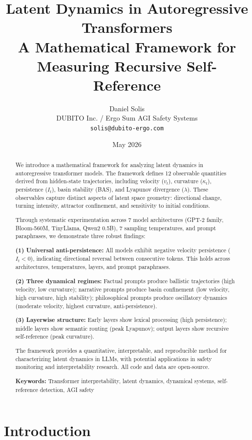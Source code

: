 \documentclass[12pt,a4paper]{article}
\title{Latent Dynamics in Autoregressive Transformers\\
\large A Mathematical Framework for Measuring Recursive Self-Reference}
\author{Daniel Solis\\
\small DUBITO Inc. / Ergo Sum AGI Safety Systems\\
\small \texttt{solis@dubito-ergo.com}}
\date{May 2026}
\begin{document}
\maketitle

\begin{abstract}
We introduce a mathematical framework for analyzing latent dynamics in autoregressive transformer models. The framework defines 12 observable quantities derived from hidden-state trajectories, including velocity ($v_t$), curvature ($\kappa_t$), persistence ($I_t$), basin stability (BAS), and Lyapunov divergence ($\lambda$). These observables capture distinct aspects of latent space geometry: directional change, turning intensity, attractor confinement, and sensitivity to initial conditions.

Through systematic experimentation across 7 model architectures (GPT-2 family, Bloom-560M, TinyLlama, Qwen2 0.5B), 7 sampling temperatures, and prompt paraphrases, we demonstrate three robust findings:

\textbf{(1) Universal anti-persistence:} All models exhibit negative velocity persistence ($I_t < 0$), indicating directional reversal between consecutive tokens. This holds across architectures, temperatures, layers, and prompt paraphrases.

\textbf{(2) Three dynamical regimes:} Factual prompts produce ballistic trajectories (high velocity, low curvature); narrative prompts produce basin confinement (low velocity, high curvature, high stability); philosophical prompts produce oscillatory dynamics (moderate velocity, highest curvature, anti-persistence).

\textbf{(3) Layerwise structure:} Early layers show lexical processing (high persistence); middle layers show semantic routing (peak Lyapunov); output layers show recursive self-reference (peak curvature).

The framework provides a quantitative, interpretable, and reproducible method for characterizing latent dynamics in LLMs, with potential applications in safety monitoring and interpretability research. All code and data are open-source.

\textbf{Keywords:} Transformer interpretability, latent dynamics, dynamical systems, self-reference detection, AGI safety
\end{abstract}

\section{Introduction}
\end{document}

